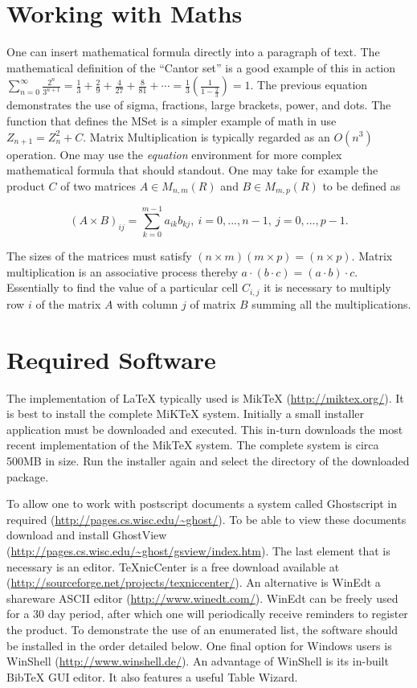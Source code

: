 \section{Working with Maths}
One can insert mathematical formula directly into a paragraph of text. The mathematical definition of the ``Cantor set'' is a good example of this in action
$\displaystyle\sum_{n=0}^\infty \frac{2^n}{3^{n+1}} = \frac{1}{3} +
\frac{2}{9} + \frac{4}{27} + \frac{8}{81} + \cdots =
\frac{1}{3}\left(\frac{1}{1-\frac{2}{3}}\right) = 1$. The previous equation demonstrates the use of sigma, fractions, large brackets, power, and dots. The function that defines the MSet is a simpler example of math in use $Z_{n+1} =
Z_{n}^2 + C$. Matrix Multiplication is typically regarded as an $O(n^3)$
operation. One may use the \emph{equation} environment for more complex mathematical formula that should standout. One may take for example the product  $C$ of two matrices $A \in M_{n,m}(R)$ and $B \in
M_{m,p}(R)$ to be defined as

\begin{equation}
(A \times B)_{ij} = \sum_{k=0} ^{m-1} a_{ik}b_{kj},~
i=0,...,n-1,~j=0,...,p-1.
\end{equation}

The sizes of the matrices must satisfy $(n \times m)(m \times p) =
(n \times p)$. Matrix multiplication is an associative process
thereby $a\cdot(b \cdot c) = (a \cdot b) \cdot c$. Essentially to
find the value of a particular cell $C_{i,j}$ it is necessary to
multiply row $i$ of the matrix $A$ with column $j$ of matrix $B$
summing all the multiplications.


\section{Required Software}

The implementation of \LaTeX \hspace{2 pt} typically used is MikTeX (\url{http://miktex.org/}). It is best to install the complete MiKTeX  system. Initially a small installer application must be downloaded and executed. This in-turn downloads the most recent implementation of the MikTeX system. The complete system is circa 500MB in size. Run the installer again and select the directory of the downloaded package.

To allow one to work with postscript documents a system called Ghostscript in required (\url{http://pages.cs.wisc.edu/~ghost/}). To be able to view these documents download and install GhostView (\url{http://pages.cs.wisc.edu/~ghost/gsview/index.htm}). The last element that is necessary is an editor. TeXnicCenter is a free download available at (\url{http://sourceforge.net/projects/texniccenter/}). An alternative is WinEdt a shareware ASCII editor (\url{http://www.winedt.com/}). WinEdt can be freely used for a 30 day period, after which one will periodically receive reminders to register the product. To demonstrate the use of an enumerated list, the software should be installed in the order detailed below. One final option for Windows users is WinShell (\url{http://www.winshell.de/}). An advantage of WinShell is its in-built BibTeX GUI editor. It also features a useful Table Wizard.

